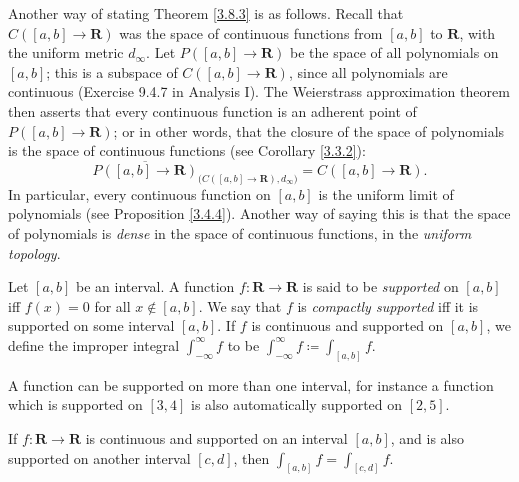 \begin{note}
    Another way of stating Theorem \ref{3.8.3} is as follows.
    Recall that \(C([a, b] \to \mathbf{R})\) was the space of continuous functions from \([a, b]\) to \(\mathbf{R}\), with the uniform metric \(d_\infty\).
    Let \(P([a, b] \to \mathbf{R})\) be the space of all polynomials on \([a, b]\);
    this is a subspace of \(C([a, b] \to \mathbf{R})\), since all polynomials are continuous (Exercise 9.4.7 in Analysis I).
    The Weierstrass approximation theorem then asserts that every continuous function is an adherent point of \(P([a, b] \to \mathbf{R})\);
    or in other words, that the closure of the space of polynomials is the space of continuous functions (see Corollary \ref{3.3.2}):
    \[
        \overline{P([a, b] \to \mathbf{R})}_{\big(C([a, b] \to \mathbf{R}), d_\infty\big)} = C([a, b] \to \mathbf{R}).
    \]
    In particular, every continuous function on \([a, b]\) is the uniform limit of polynomials (see Proposition \ref{3.4.4}).
    Another way of saying this is that the space of polynomials is \emph{dense} in the space of continuous functions, in the \emph{uniform topology}.
\end{note}

\begin{definition}\label{3.8.4}
    Let \([a, b]\) be an interval.
    A function \(f : \mathbf{R} \to \mathbf{R}\) is said to be \emph{supported} on \([a, b]\) iff \(f(x) = 0\) for all \(x \notin [a, b]\).
    We say that \(f\) is \emph{compactly supported} iff it is supported on some interval \([a, b]\).
    If \(f\) is continuous and supported on \([a, b]\), we define the improper integral \(\int_{-\infty}^\infty f\) to be \(\int_{-\infty}^\infty f \coloneqq \int_{[a, b]} f\).
\end{definition}

\begin{note}
    A function can be supported on more than one interval, for instance a function which is supported on \([3, 4]\) is also automatically supported on \([2, 5]\).
\end{note}

\begin{lemma}\label{3.8.5}
    If \(f : \mathbf{R} \to \mathbf{R}\) is continuous and supported on an interval \([a, b]\), and is also supported on another interval \([c, d]\), then \(\int_{[a, b]} f = \int_{[c, d]} f\).
\end{lemma}

